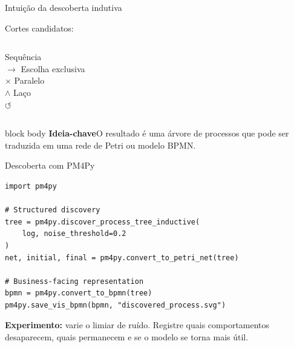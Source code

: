 \documentclass[aspectratio=169,11pt]{beamer}
\newcommand{\keyidea}[1]{%
  \begin{beamercolorbox}[rounded=true,sep=0.65em]{block body}
    \textbf{\color{Teal}Ideia-chave}\quad #1
  \end{beamercolorbox}
}
\begin{document}
\begin{frame}{Intuição da descoberta indutiva}
  \centering
  \vspace{0.55cm}
  Cortes candidatos:
  \begin{columns}[T,onlytextwidth]
    \centering Sequência\\$\rightarrow$
    \centering Escolha exclusiva\\$\times$
    \centering Paralelo\\$\wedge$
    \centering Laço\\$\circlearrowleft$
  \end{columns}
  \vspace{0.45cm}
  \keyidea{O resultado é uma árvore de processos que pode ser traduzida em uma rede de Petri ou modelo BPMN.}
\end{frame}

\begin{frame}[fragile]{Descoberta com PM4Py}
\begin{lstlisting}[style=python]
import pm4py

# Structured discovery
tree = pm4py.discover_process_tree_inductive(
    log, noise_threshold=0.2
)
net, initial, final = pm4py.convert_to_petri_net(tree)

# Business-facing representation
bpmn = pm4py.convert_to_bpmn(tree)
pm4py.save_vis_bpmn(bpmn, "discovered_process.svg")
\end{lstlisting}
  \vspace{0.15cm}
  \textbf{Experimento:} varie o limiar de ruído. Registre quais comportamentos desaparecem, quais permanecem e se o modelo se torna mais útil.
\end{frame}

\end{document}
